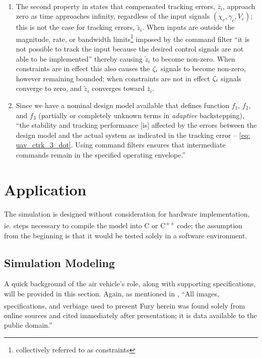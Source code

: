 \documentclass[12pt]{ucthesis}
\begin{document}
\begin{rem} \alignright \citet{Farrell2005}\\
\vspace{-20pt}
	\begin{enumerate}[labelindent=\parindent,leftmargin=\parindent,noitemsep,nosep]
		\item The second property in  states that compensated tracking errors, $\bar{z}_i$, approach zero as time approaches infinity, regardless of the input signals $(\chi_c, \gamma_c, V_c)$; this is not the case for tracking errors, $\tilde{z}_i$. When inputs are outside the magnitude, rate, or bandwidth limits\footnote{collectively referred to as constraints} imposed by the command filter ``it is not possible to track the input because the desired control signals are not able to be implemented'' thereby causing $\tilde{z}_i$ to become non-zero. When constraints are in effect this also causes the $\zeta_i$ signals to become non-zero, however remaining bounded; when constraints are not in effect $\zeta_i$ signals converge to zero, and $\tilde{z}_i$ converges toward $\bar{z}_i$.
		\item Since we have a nominal design model available that defines function $f_1$, $f_2$, and $f_3$ (partially or completely unknown terms in \textit{adaptive} backstepping), ``the stability and tracking performance [is] affected by the errors between the design model and the actual system as indicated in the tracking error  -- \ref{eq: uav_ctrk_3_dot}. Using command filters ensures that intermediate commands remain in the specified operating envelope.''
	\end{enumerate}
\end{rem}

\newpage
\thispagestyle{empty}
\mbox{}
\newpage

\chapter{Application}
\label{chp: uav_app}
%
The simulation is designed without consideration for hardware implementation, ie. steps necessary to compile the model into C or C\textsuperscript{++} code; the assumption from the beginning is that it would be tested solely in a software environment. 

\section{Simulation Modeling}
\label{sec: simulink}
%
A quick background of the air vehicle's role, along with supporting specifications, will be provided in this section. Again, as mentioned in , ``All images, specifications, and verbiage used to present Fury\textsuperscript{\textregistered} herein was found solely from online sources and cited immediately after presentation; it is data available to the public domain.''
\end{document}
